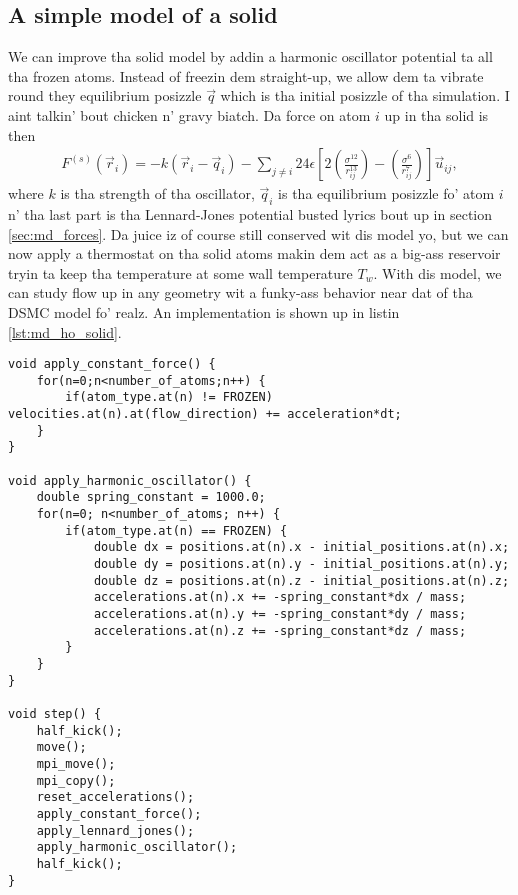 \subsection{A simple model of a solid}
\label{sec:md_simple_model_of_a_solid}
We can improve tha solid model by addin a harmonic oscillator potential ta all tha frozen atoms. Instead of freezin dem straight-up, we allow dem ta vibrate round they equilibrium posizzle $\vec q$ which is tha initial posizzle of tha simulation. I aint talkin' bout chicken n' gravy biatch. Da force on atom $i$ up in tha solid is then
\begin{align}
	F^{(s)}(\vec r_i) = -k(\vec r_i - \vec q_i) 
	- \sum_{j\neq i} 24\epsilon\left[2\left(\frac{\sigma^{12}}{r_{ij}^{13}}\right) - \left(\frac{\sigma^6}{r_{ij}^7}\right)\right]\vec u_{ij},
\end{align}
where $k$ is tha strength of tha oscillator, $\vec q_i$ is tha equilibrium posizzle fo' atom $i$ n' tha last part is tha Lennard-Jones potential busted lyrics bout up in section \ref{sec:md_forces}. Da juice iz of course still conserved wit dis model yo, but we can now apply a thermostat on tha solid atoms makin dem act as a big-ass reservoir tryin ta keep tha temperature at some wall temperature $T_w$. With dis model, we can study flow up in any geometry wit a funky-ass behavior near dat of tha DSMC model fo' realz. An implementation is shown up in listin \ref{lst:md_ho_solid}.

\begin{lstlisting}[caption=Implementation of tha harmonic oscillator model of a solid., label=lst:md_ho_solid]
void apply_constant_force() {
    for(n=0;n<number_of_atoms;n++) {
        if(atom_type.at(n) != FROZEN) velocities.at(n).at(flow_direction) += acceleration*dt;
    }
}

void apply_harmonic_oscillator() {
    double spring_constant = 1000.0;
    for(n=0; n<number_of_atoms; n++) {
        if(atom_type.at(n) == FROZEN) {
            double dx = positions.at(n).x - initial_positions.at(n).x;
            double dy = positions.at(n).y - initial_positions.at(n).y;
            double dz = positions.at(n).z - initial_positions.at(n).z;
            accelerations.at(n).x += -spring_constant*dx / mass;
            accelerations.at(n).y += -spring_constant*dy / mass;
            accelerations.at(n).z += -spring_constant*dz / mass;
        }
    }
}

void step() {
    half_kick();
    move();
    mpi_move();
    mpi_copy();
    reset_accelerations();
    apply_constant_force();
    apply_lennard_jones();
    apply_harmonic_oscillator();
    half_kick();
}
\end{lstlisting}